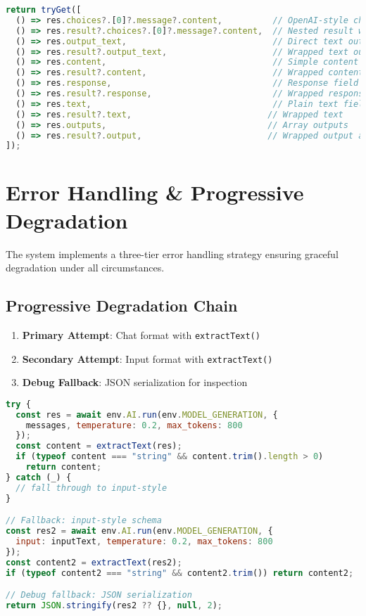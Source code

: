 \documentclass[11pt,a4paper]{article}
\begin{document}
\begin{lstlisting}[language=JavaScript, caption=Comprehensive Fallback Paths]
return tryGet([
  () => res.choices?.[0]?.message?.content,          // OpenAI-style chat
  () => res.result?.choices?.[0]?.message?.content,  // Nested result wrapper
  () => res.output_text,                             // Direct text output
  () => res.result?.output_text,                     // Wrapped text output
  () => res.content,                                 // Simple content field
  () => res.result?.content,                         // Wrapped content
  () => res.response,                                // Response field
  () => res.result?.response,                        // Wrapped response
  () => res.text,                                    // Plain text field
  () => res.result?.text,                           // Wrapped text
  () => res.outputs,                                // Array outputs
  () => res.result?.output,                         // Wrapped output arrays
]);
\end{lstlisting}

\section{Error Handling \& Progressive Degradation}

The system implements a three-tier error handling strategy ensuring graceful degradation under all circumstances.

\subsection{Progressive Degradation Chain}

\begin{enumerate}
    \item \textbf{Primary Attempt}: Chat format with \texttt{extractText()}
    \item \textbf{Secondary Attempt}: Input format with \texttt{extractText()}
    \item \textbf{Debug Fallback}: JSON serialization for inspection
\end{enumerate}

\begin{lstlisting}[language=JavaScript, caption=Progressive Degradation Implementation]
try {
  const res = await env.AI.run(env.MODEL_GENERATION, { 
    messages, temperature: 0.2, max_tokens: 800 
  });
  const content = extractText(res);
  if (typeof content === "string" && content.trim().length > 0) 
    return content;
} catch (_) {
  // fall through to input-style
}

// Fallback: input-style schema
const res2 = await env.AI.run(env.MODEL_GENERATION, { 
  input: inputText, temperature: 0.2, max_tokens: 800 
});
const content2 = extractText(res2);
if (typeof content2 === "string" && content2.trim()) return content2;

// Debug fallback: JSON serialization
return JSON.stringify(res2 ?? {}, null, 2);
\end{lstlisting}
\end{document}
